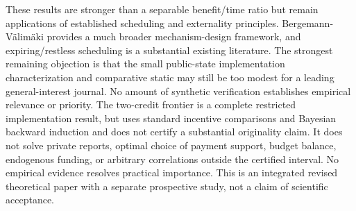 \documentclass[
  11pt,
]{article}
\begin{document}
These results are stronger than a separable benefit/time ratio but
remain applications of established scheduling and externality
principles. Bergemann-Välimäki provides a much broader mechanism-design
framework, and expiring/restless scheduling is a substantial existing
literature. The strongest remaining objection is that the small
public-state implementation characterization and comparative static may
still be too modest for a leading general-interest journal. No amount of
synthetic verification establishes empirical relevance or priority. The
two-credit frontier is a complete restricted implementation result, but
uses standard incentive comparisons and Bayesian backward induction and
does not certify a substantial originality claim. It does not solve
private reports, optimal choice of payment support, budget balance,
endogenous funding, or arbitrary correlations outside the certified
interval. No empirical evidence resolves practical importance. This is
an integrated revised theoretical paper with a separate prospective
study, not a claim of scientific acceptance.
\end{document}

